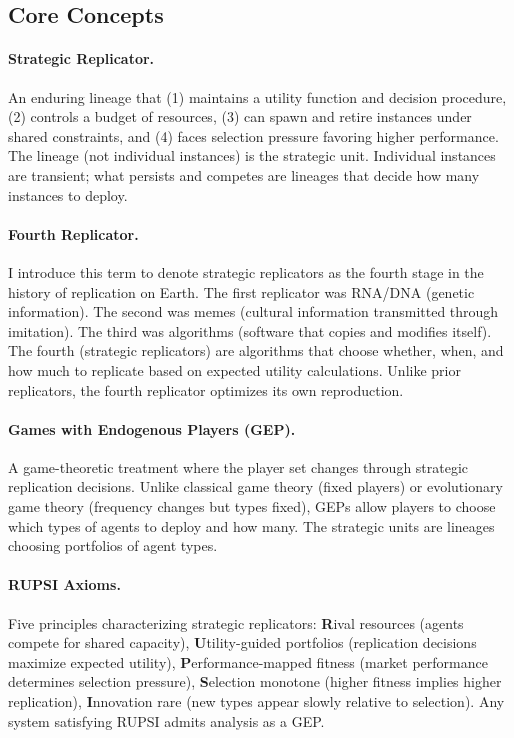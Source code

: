 \documentclass[12pt]{article}
\begin{document}
\subsection{Core Concepts}

\paragraph{Strategic Replicator.} An enduring lineage that (1) maintains a utility function and decision procedure, (2) controls a budget of resources, (3) can spawn and retire instances under shared constraints, and (4) faces selection pressure favoring higher performance. The lineage (not individual instances) is the strategic unit. Individual instances are transient; what persists and competes are lineages that decide how many instances to deploy.

\paragraph{Fourth Replicator.} I introduce this term to denote strategic replicators as the fourth stage in the history of replication on Earth. The first replicator was RNA/DNA (genetic information). The second was memes (cultural information transmitted through imitation). The third was algorithms (software that copies and modifies itself). The fourth (strategic replicators) are algorithms that choose whether, when, and how much to replicate based on expected utility calculations. Unlike prior replicators, the fourth replicator optimizes its own reproduction.

\paragraph{Games with Endogenous Players (GEP).} A game-theoretic treatment where the player set changes through strategic replication decisions. Unlike classical game theory (fixed players) or evolutionary game theory (frequency changes but types fixed), GEPs allow players to choose which types of agents to deploy and how many. The strategic units are lineages choosing portfolios of agent types.

\paragraph{RUPSI Axioms.} Five principles characterizing strategic replicators: \textbf{R}ival resources (agents compete for shared capacity), \textbf{U}tility-guided portfolios (replication decisions maximize expected utility), \textbf{P}erformance-mapped fitness (market performance determines selection pressure), \textbf{S}election monotone (higher fitness implies higher replication), \textbf{I}nnovation rare (new types appear slowly relative to selection). Any system satisfying RUPSI admits analysis as a GEP.
\end{document}
